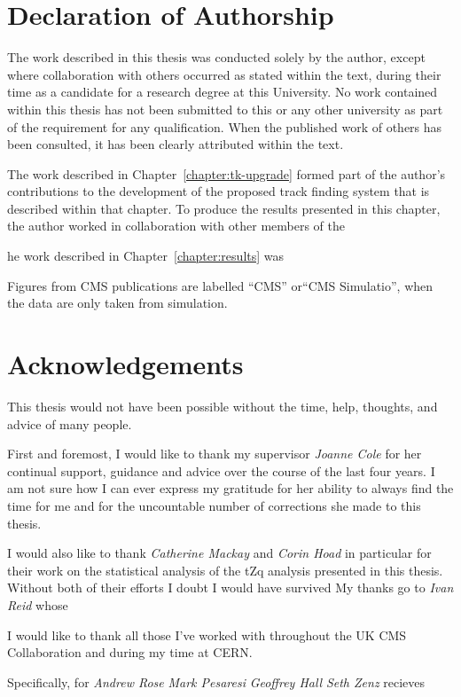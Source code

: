 \documentclass[11pt,a4paper]{report}
\begin{document}
\chapter*{Declaration of Authorship} \label{sec:declaration}
The work described in this thesis was conducted solely by the author, except where collaboration with others occurred as stated within the text, during their time as a candidate for a research degree at this University.
No work contained within this thesis has not been submitted to this or any other university as part of the requirement for any qualification.
When the published work of others has been consulted, it has been clearly attributed within the text.

The work described in Chapter~\ref{chapter:tk-upgrade} formed part of the author's contributions to the development of the proposed track finding system that is described within that chapter.
To produce the results presented in this chapter, the author worked in collaboration with other members of the 

he work described in Chapter~\ref{chapter:results} was 

Figures from CMS publications are labelled ``CMS'' or``CMS Simulatio'', when the data are only taken from simulation.

\clearpage
\newpage

\chapter*{Acknowledgements} \label{sec:acknowledgments}
This thesis would not have been possible without the time, help, thoughts, and advice of many people.

First and foremost, I would like to thank my supervisor \textit{Joanne Cole} for her continual support, guidance and advice over the course of the last four years.
I am not sure how I can ever express my gratitude for her ability to always find the time for me and for the uncountable number of corrections she made to this thesis.

I would also like to thank \textit{Catherine Mackay} and \textit{Corin Hoad} in particular for their work on the statistical analysis of the tZq analysis presented in this thesis.
Without both of their efforts I doubt I would have survived 
My thanks go to \textit{Ivan Reid} whose 


I would like to thank all those I've worked with throughout the UK CMS Collaboration and during my time at CERN.

Specifically, for 
\textit{Andrew Rose}
\textit{Mark Pesaresi}
\textit{Geoffrey Hall}
\textit{Seth Zenz} recieves
\end{document}
